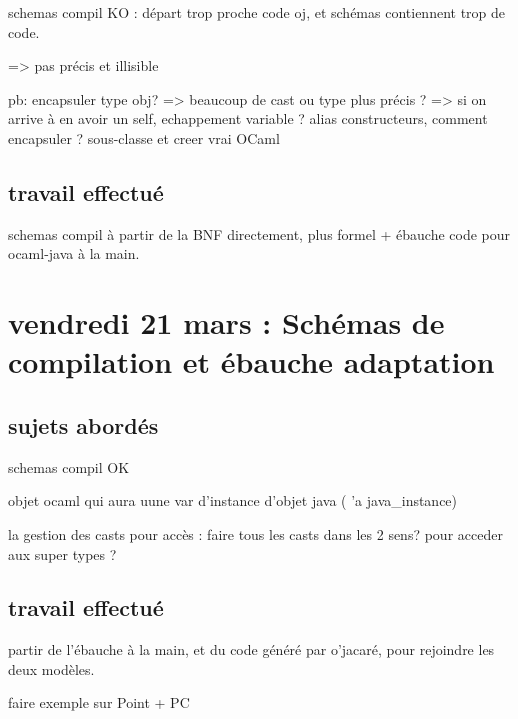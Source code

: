 \documentclass[a4paper, 11pt]{report}
\begin{document}
schemas compil KO : départ trop proche code oj, et schémas contiennent
trop de code.

=> pas précis et illisible

pb: encapsuler type obj? => beaucoup de cast
    ou type plus précis ? => si on arrive à en avoir un
self, echappement variable ?
alias constructeurs, comment encapsuler ?
sous-classe et creer vrai OCaml

\subsection{travail effectué}

schemas compil à partir de la BNF directement, plus formel
+ ébauche code pour ocaml-java à la main.





\section{vendredi 21 mars : Schémas de compilation et ébauche adaptation}
\subsection{sujets abordés}

schemas compil OK

objet ocaml qui aura uune var d'instance d'objet java ( 'a
java\_instance)

la gestion des casts pour accès : faire tous les casts dans les 2 sens?
pour acceder aux super types ?

\subsection{travail effectué}

partir de l'ébauche à la main, et du code généré par o'jacaré, pour
rejoindre les deux modèles.

faire exemple sur Point + PC





\end{document}

